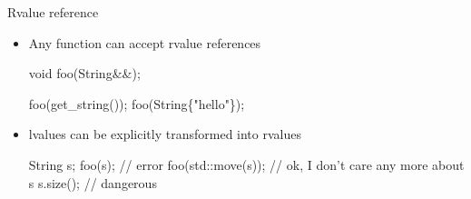 \begin{frame}[fragile]{Rvalue reference \insertcontinuationtext}
  \begin{itemize}
  \item Any function can accept rvalue references
    \begin{codeblock}
void foo(String&&);

foo(get\_string());
foo(String\{"hello"\});\end{codeblock}
  \item lvalues can be explicitly transformed into rvalues
    \begin{codeblock}
String s;
foo(s);            // error
foo(std::move(s)); // ok, I don't care any more about s
s.size();          // dangerous\end{codeblock}
  \end{itemize}

\end{frame}

